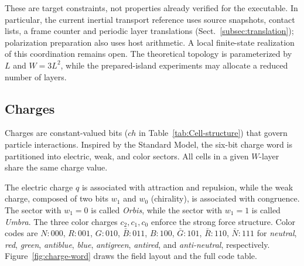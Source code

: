 \documentclass[a4paper]{article}
\begin{document}
These are target constraints, not properties already verified for the executable. In particular, the current inertial transport reference uses source snapshots, contact lists, a frame counter and periodic layer translations (Sect.~\ref{subsec:translation}); polarization preparation also uses host arithmetic. A local finite-state realization of this coordination remains open. The theoretical topology is parameterized by $L$ and $W=3L^2$, while the prepared-island experiments may allocate a reduced number of layers.

\subsection{Charges}
\label{subsec:charges}

Charges are constant-valued bits ($ch$ in Table~\ref{tab:Cell-structure}) that govern particle interactions. Inspired by the Standard Model, the six-bit charge word is partitioned into electric, weak, and color sectors. All cells in a given $W$-layer share the same charge value.

The electric charge $q$ is associated with attraction and repulsion, while the weak charge, composed of two bits $w_1$ and $w_0$ (chirality), is associated with congruence. The sector with $w_1 = 0$ is called \emph{Orbis}, while the sector with $w_1 = 1$ is called \emph{Umbra}. The three color charges $c_2, c_1, c_0$ enforce the strong force structure. Color codes are $N:000$, $R:001$, $G:010$, $\bar{B}:011$, $B:100$, $\bar{G}:101$, $\bar{R}:110$, $\bar{N}:111$ for \emph{neutral}, \emph{red}, \emph{green}, \emph{antiblue}, \emph{blue}, \emph{antigreen}, \emph{antired}, and \emph{anti-neutral}, respectively. Figure~\ref{fig:charge-word} draws the field layout and the full code table.
\end{document}
